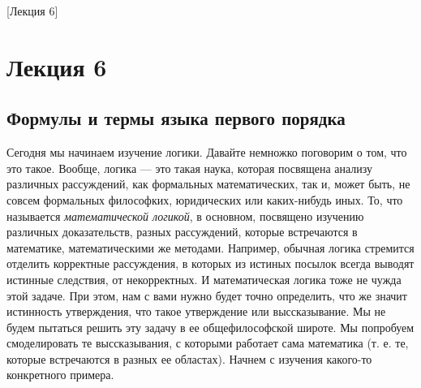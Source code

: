 [Лекция 6]

\section{Лекция 6}

\subsection{Формулы и термы языка первого порядка}

Сегодня мы начинаем изучение логики.
Давайте немножко поговорим о том, что это такое.
Вообще, логика --- это такая наука, которая посвящена анализу различных рассуждений, как формальных математических, так и, может быть, не совсем формальных философких, юридических или каких-нибудь иных.
То, что называется {\it математической логикой}, в основном, посвящено изучению различных доказательств, разных рассуждений, которые встречаются в математике, математическими же методами.
Например, обычная логика стремится отделить корректные рассуждения, в которых из истиных посылок всегда выводят истинные следствия, от некорректных.
И математическая логика тоже не чужда этой задаче.
При этом, нам с вами нужно будет точно определить, что же значит истинность утверждения, что такое утверждение или выссказывание.
Мы не будем пытаться решить эту задачу в ее общефилософской широте.
Мы попробуем смоделировать те выссказывания, с которыми работает сама математика (т. е. те, которые встречаются в разных ее областах).
Начнем с изучения какого-то конкретного примера.

